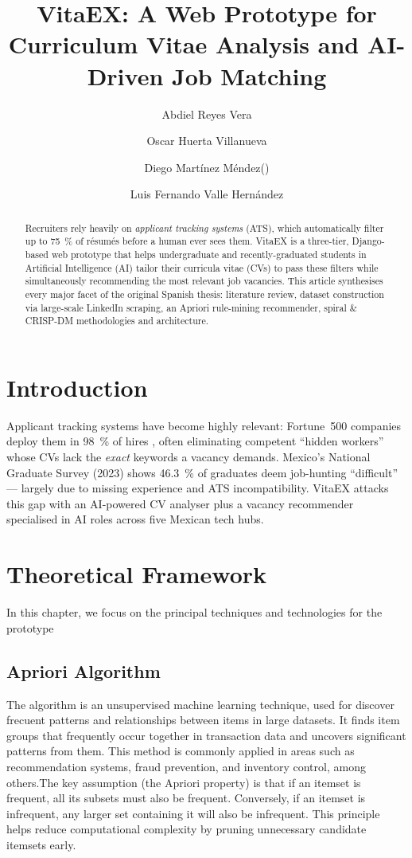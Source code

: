 \documentclass[runningheads]{llncs}
\title{VitaEX: A Web Prototype for Curriculum Vitae Analysis and AI-Driven Job Matching}
\author{
	Abdiel Reyes Vera\inst{1,2} \and
	Oscar Huerta Villanueva\inst{1} \and
	Diego Martínez Méndez\inst{1}(\Letter) \and 
	Luis Fernando Valle Hernández\inst{1} 
}
\institute{
	Escuela Superior de Cómputo, IPN, Mexico City, Mexico \\
	\texttt{\Letter~dmartinezm1707@alumno.ipn.mx} 
	\and
	Centro de Investigación en Computación, IPN, Mexico City, Mexico
}
\begin{document}
	\maketitle
	
	\begin{abstract}
		Recruiters rely heavily on \emph{applicant tracking systems} (ATS), which automatically filter up to 75~\% of résumés before a human ever sees them. VitaEX is a three-tier, Django-based web prototype that helps undergraduate and recently-graduated students in Artificial Intelligence (AI) tailor their curricula vitae (CVs) to pass these filters while simultaneously recommending the most relevant job vacancies. This article synthesises every major facet of the original Spanish thesis: literature review, dataset construction via large-scale LinkedIn scraping, an Apriori rule-mining recommender, spiral \& CRISP-DM methodologies and architecture.
		
		
		 
	\end{abstract}
	

	
	\section{Introduction}
	Applicant tracking systems have become highly relevant: Fortune~500 companies deploy them in 98~\% of hires \cite{ats1}, often eliminating competent “hidden workers” whose CVs lack the \emph{exact} keywords a vacancy demands. Mexico’s National Graduate Survey (2023) shows 46.3~\% \cite{uvm2023} of graduates deem job-hunting “difficult” — largely due to missing experience and ATS incompatibility. VitaEX attacks this gap with an AI-powered CV analyser plus a vacancy recommender specialised in AI roles across five Mexican tech hubs.
	
	\section{Theoretical Framework}
	In this chapter, we focus on the principal techniques and technologies for the prototype
	\subsection{Apriori Algorithm}
	
	The algorithm is an unsupervised machine learning technique, used for discover frecuent patterns and relationships between items in large datasets. It finds item groups that frequently occur together in transaction data and uncovers significant patterns from them. This method is commonly applied in areas such as recommendation systems, fraud prevention, and inventory control, among others.The key assumption (the Apriori property) is that if an itemset is frequent, all its subsets must also be frequent. Conversely, if an itemset is infrequent, any larger set containing it will also be infrequent. This principle helps reduce computational complexity by pruning unnecessary candidate itemsets early. \cite{ibm_apriori}
\end{document}
